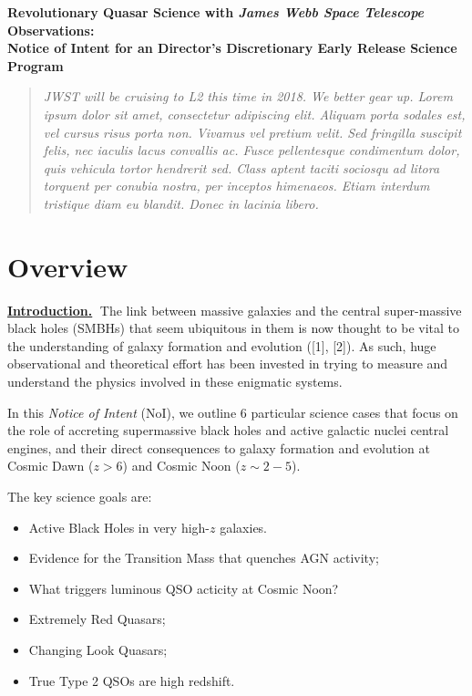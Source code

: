 \documentclass[11pt,epsf]{article}
\begin{document}
\vspace{-44pt} 
\begin{center}
  {\Large \bf Revolutionary Quasar Science with  {\it James Webb Space Telescope} Observations:\\
    Notice of Intent for an Director's Discretionary Early Release Science Program}
\end{center}

\begin{quotation}
\noindent
{\it  JWST will be cruising to L2 this time in 2018. We better gear up. 
Lorem ipsum dolor sit amet, consectetur adipiscing elit. Aliquam porta
sodales est, vel cursus risus porta non. Vivamus vel pretium
velit. Sed fringilla suscipit felis, nec iaculis lacus convallis
ac. Fusce pellentesque condimentum dolor, quis vehicula tortor
hendrerit sed. Class aptent taciti sociosqu ad litora torquent per
conubia nostra, per inceptos himenaeos. Etiam interdum tristique diam
eu blandit. Donec in lacinia libero.}
\noindent
\end{quotation}


\section{Overview}
\smallskip
\smallskip
\noindent
{\bf \underline{Introduction.}$\;$}
The link between massive galaxies and the central super-massive black
holes (SMBHs) that seem ubiquitous in them is now thought to be vital
to the understanding of galaxy formation and evolution ([1], [2]).  As
such, huge observational and theoretical effort has been invested in
trying to measure and understand the physics involved in these
enigmatic systems. 


\smallskip
\smallskip
\noindent
In this {\it Notice of Intent} (NoI), we outline 6 particular science
cases that focus on the role of accreting supermassive black holes and
active galactic nuclei central engines, and their direct consequences
to galaxy formation and evolution at Cosmic Dawn ($z>6$) and Cosmic
Noon ($z\sim2-5$).

\smallskip
\smallskip
\noindent
The key science goals are:
\begin{itemize}
    \item{Active Black Holes in very high-$z$ galaxies.} 
    \item{Evidence for the Transition Mass that quenches AGN activity;}
    \item{What triggers luminous QSO acticity at Cosmic Noon?}
    \item{Extremely Red Quasars;}
    \item{Changing Look Quasars;}
    \item{True Type 2 QSOs are high redshift.}
\end{itemize}
\end{document}
